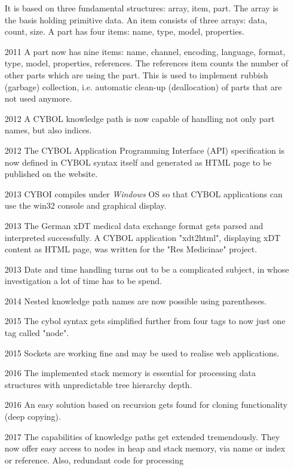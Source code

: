 \begin{itemize}
        It is based on three fundamental structures: array, item, part.
        The array is the basis holding primitive data.
        An item consists of three arrays: data, count, size.
        A part has four items: name, type, model, properties.
    \item[2011] A part now has nine items: name, channel, encoding, language,
        format, type, model, properties, references.
        The references item counts the number of other parts which are using the part.
        This is used to implement rubbish (garbage) collection,
        i.e. automatic clean-up (deallocation) of parts that are not used anymore.
    \item[2012] A CYBOL knowledge path is now capable of handling not only part names,
        but also indices.
    \item[2012] The CYBOL Application Programming Interface (API) specification
        is now defined in CYBOL syntax itself and generated as HTML page to be
        published on the website.
    \item[2013] CYBOI compiles under \emph{Windows} OS so that
        CYBOL applications can use the win32 console and graphical display.
    \item[2013] The German xDT medical data exchange format gets parsed and
        interpreted successfully. A CYBOL application "xdt2html", displaying
        xDT content as HTML page, was written for the "Res Medicinae" project.
    \item[2013] Date and time handling turns out to be a complicated subject,
        in whose investigation a lot of time has to be spend.
    \item[2014] Nested knowledge path names are now possible using parentheses.
    \item[2015] The cybol syntax gets simplified further from four tags
        to now just one tag called "node".
    \item[2015] Sockets are working fine and may be used to realise web applications.
    \item[2016] The implemented stack memory is essential for processing
        data structures with unpredictable tree hierarchy depth.
    \item[2016] An easy solution based on recursion gets found for cloning
        functionality (deep copying).
    \item[2017] The capabilities of knowledge paths get extended tremendously.
        They now offer easy access to nodes in heap and stack memory,
        via name or index or reference. Also, redundant code for processing

\end{itemize}
